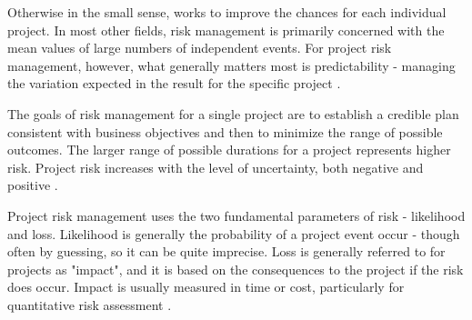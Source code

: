 Otherwise in the small sense, works to improve the chances for each individual project. In most other fields, risk management is primarily concerned with the mean values of large numbers of independent events. For project risk management, however, what generally matters most is predictability - managing the variation expected in the result for the specific project \cite{kendrick2003identifying}.

The goals of risk management for a single project are to establish a credible plan consistent with business objectives and then to minimize the range of possible outcomes. The larger range of possible durations for a project represents higher risk. Project risk increases with the level of uncertainty, both negative and positive \cite{kendrick2003identifying}.

Project risk management uses the two fundamental parameters of risk - likelihood and loss. Likelihood is generally the probability of a project event occur - though often by guessing, so it can be quite imprecise. Loss is generally referred to for projects as "impact", and it is based on the consequences to the project if the risk does occur. Impact is usually measured in time or cost, particularly for quantitative risk assessment \cite{kendrick2003identifying}.

